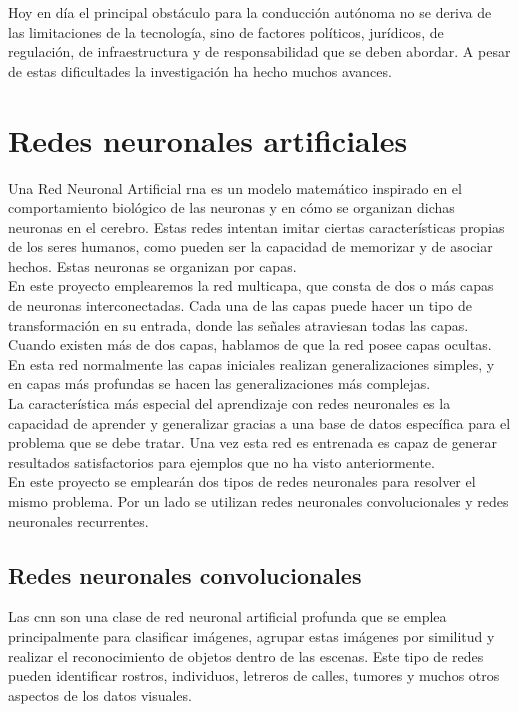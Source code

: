 Hoy en día el principal obstáculo para la conducción autónoma no se deriva de las limitaciones de la tecnología, sino de factores políticos, jurídicos, de regulación, de infraestructura y de responsabilidad que se deben abordar. A pesar de estas dificultades la investigación ha hecho muchos avances.\\


\section{Redes neuronales artificiales}

Una Red Neuronal Artificial \acrshort{rna} es un modelo matemático inspirado en el comportamiento biológico de las neuronas y en cómo se organizan dichas neuronas en el cerebro. Estas redes intentan imitar ciertas  características propias de los seres humanos, como pueden ser la capacidad de memorizar y de asociar hechos. Estas neuronas se organizan por capas.\\

En este proyecto emplearemos la red multicapa, que consta de dos o más capas de neuronas interconectadas. Cada una de las capas puede hacer un tipo de transformación en su entrada, donde las señales atraviesan todas las capas. Cuando existen más de dos capas, hablamos de que la red posee capas ocultas. En esta red normalmente las capas iniciales realizan generalizaciones simples, y en capas más profundas se hacen las generalizaciones más complejas.\\

La característica más especial del aprendizaje con redes neuronales es la capacidad de aprender y generalizar gracias a una base de datos específica para el problema que se debe tratar. Una vez esta red es entrenada es capaz de generar resultados satisfactorios para ejemplos que no ha visto anteriormente.\\

En este proyecto se emplearán dos tipos de redes neuronales para resolver el mismo problema. Por un lado se utilizan redes neuronales convolucionales y redes neuronales recurrentes.


\subsection{Redes neuronales convolucionales}

Las \acrfull{cnn} son una clase de red neuronal artificial profunda que se emplea principalmente para clasificar imágenes, agrupar estas imágenes por similitud y realizar el reconocimiento de objetos dentro de las escenas. Este tipo de redes pueden identificar rostros, individuos, letreros de calles, tumores y muchos otros aspectos de los datos visuales.\\

